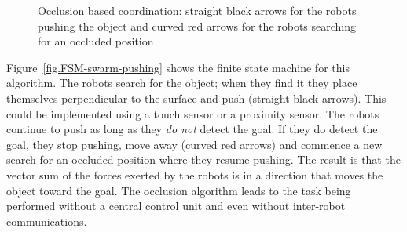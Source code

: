 \begin{figure}
\begin{center}
\end{center}
\caption{Occlusion based coordination: straight black arrows for the robots pushing the object and curved red arrows for the robots searching for an occluded position}\label{fig.swarm-pushing}
\end{figure}

Figure~\ref{fig.FSM-swarm-pushing} shows the finite state machine for this algorithm. The robots search for the object; when they find it they place themselves perpendicular to the surface and push (straight black arrows). This could be implemented using a touch sensor or a proximity sensor. The robots continue to push as long as they \emph{do not} detect the goal. If they do detect the goal, they stop pushing, move away (curved red arrows) and commence a new search for an occluded position where they resume pushing. The result is that the vector sum of the forces exerted by the robots is in a direction that moves the object toward the goal. The occlusion algorithm leads to the task being performed without a central control unit and even without inter-robot communications.

